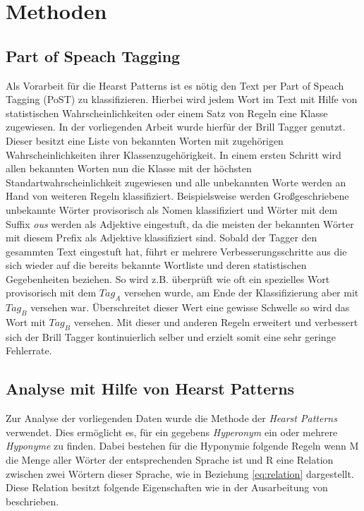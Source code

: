 \section{Methoden}
\subsection{Part of Speach Tagging}
Als Vorarbeit für die Hearst Patterns ist es nötig den Text per Part of Speach Tagging (PoST) zu klassifizieren.
Hierbei wird jedem Wort im Text mit Hilfe von statistischen Wahrscheinlichkeiten oder einem Satz von Regeln eine Klasse zugewiesen.
In der vorliegenden Arbeit wurde hierfür der Brill Tagger genutzt. Dieser besitzt eine Liste von bekannten Worten mit zugehörigen
Wahrscheinlichkeiten ihrer Klassenzugehörigkeit. In einem ersten Schritt wird allen bekannten Worten nun die Klasse mit der höchsten
Standartwahrscheinlichkeit zugewiesen und alle unbekannten Worte werden an Hand von weiteren Regeln klassifiziert. Beispielsweise werden Großgeschriebene 
unbekannte Wörter provisorisch als Nomen klassifiziert und Wörter mit dem Suffix \textit{ous} werden als Adjektive eingestuft,
da die meisten der bekannten Wörter mit diesem Prefix als Adjektive klassifiziert sind. Sobald der Tagger den gesammten Text eingestuft hat, führt er
mehrere Verbesserungsschritte aus die sich wieder auf die bereits bekannte Wortliste und deren statistischen Gegebenheiten beziehen. So wird z.B. 
überprüft wie oft ein spezielles Wort provisorisch mit dem $Tag_{A}$ versehen wurde, am Ende der Klassifizierung aber mit $Tag_{B}$ versehen war. 
Überschreitet dieser Wert eine gewisse Schwelle so wird das Wort mit $Tag_{B}$ versehen. Mit dieser und anderen Regeln erweitert und verbessert sich der
Brill Tagger kontinuierlich selber und erzielt somit eine sehr geringe Fehlerrate. \cite{bib:Brill1992}

\subsection{Analyse mit Hilfe von Hearst Patterns}

Zur Analyse der vorliegenden Daten wurde die Methode der \textit{Hearst Patterns} verwendet. 
Dies ermöglicht es, für ein gegebens \textit{Hyperonym} ein oder mehrere \textit{Hyponyme} zu finden. 
Dabei bestehen für die Hyponymie folgende Regeln wenn M die Menge aller Wörter der 
entsprechenden Sprache ist und R eine Relation zwischen zwei Wörtern dieser Sprache, wie in Beziehung \ref{eq:relation} dargestellt.
Diese Relation besitzt folgende Eigenschaften wie in der Ausarbeitung von  beschrieben.

